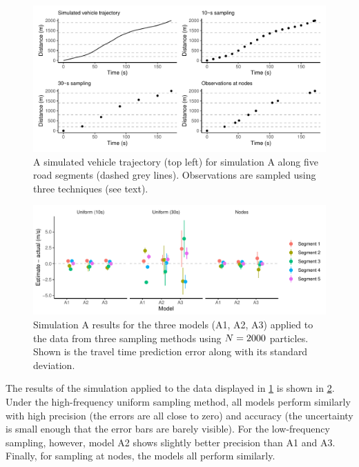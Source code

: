 \begin{knitrout}\small
{}\color{fgcolor}\begin{figure}
\includegraphics[width=\linewidth]{figure/sim1_graph-1} \caption[Vehicle trajectory with sampled observations for simulation A]{A simulated vehicle trajectory (top left) for simulation A along five road segments (dashed grey lines). Observations are sampled using three techniques (see text).}\label{fig:sim1_graph}
\end{figure}


\end{knitrout}

\begin{knitrout}\small
{}\color{fgcolor}\begin{figure}
\includegraphics[width=\linewidth]{figure/sim1_pf-1} \caption[Results for simulation A]{Simulation A results for the three models (A1, A2, A3) applied to the data from three sampling methods using $N=2000$ particles. Shown is the travel time prediction error along with its standard deviation.}\label{fig:sim1_pf}
\end{figure}


\end{knitrout}


The results of the simulation applied to the data displayed in \cref{fig:sim1_graph} is shown in \cref{fig:sim1_pf}. Under the high-frequency uniform sampling method, all models perform similarly with high precision (the errors are all close to zero) and accuracy (the uncertainty is small enough that the error bars are barely visible). For the low-frequency sampling, however, model A2 shows slightly better precision than A1 and A3. Finally, for sampling at nodes, the models all perform similarly.



